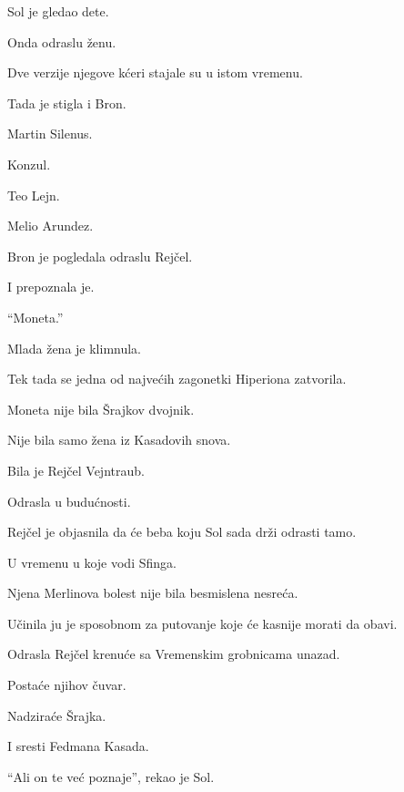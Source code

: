 Sol je gledao dete.

Onda odraslu ženu.

\bigskip

Dve verzije njegove kćeri stajale su u istom vremenu.

\bigskip

Tada je stigla i Bron.

Martin Silenus.

Konzul.

Teo Lejn.

Melio Arundez.

\bigskip

Bron je pogledala odraslu Rejčel.

I prepoznala je.

\bigskip

``Moneta.''

\bigskip

Mlada žena je klimnula.

\bigskip

Tek tada se jedna od najvećih zagonetki Hiperiona zatvorila.

\bigskip

Moneta nije bila Šrajkov dvojnik.

Nije bila samo žena iz Kasadovih snova.

\bigskip

Bila je Rejčel Vejntraub.

\bigskip

Odrasla u budućnosti.

\bigskip

Rejčel je objasnila da će beba koju Sol sada drži odrasti tamo.

U vremenu u koje vodi Sfinga.

\bigskip

Njena Merlinova bolest nije bila besmislena nesreća.

Učinila ju je sposobnom za putovanje koje će kasnije morati da obavi.

\bigskip

Odrasla Rejčel krenuće sa Vremenskim grobnicama unazad.

Postaće njihov čuvar.

Nadziraće Šrajka.

\bigskip

I sresti Fedmana Kasada.

\bigskip

``Ali on te već poznaje'', rekao je Sol.

\bigskip

